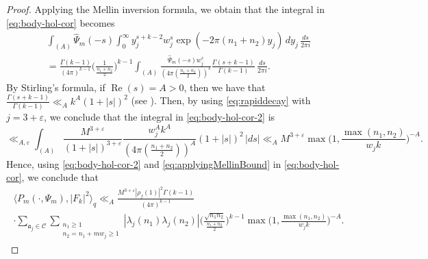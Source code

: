 \documentclass[12pt,reqno]{amsart}
\theoremstyle{remark}
\DeclareMathOperator{\Real}{Re}
\numberwithin{equation}{section}
\begin{document}
\begin{proof}
    Applying the Mellin inversion formula, we obtain that the integral in \eqref{eq:body-hol-cor} becomes 
		\begin{multline}\label{eq:body-hol-cor-2}
				\int_{(A)}\widehat{\Psi}_m(-s)\int_0^\infty y_j^{s+k-2}w_j^s\exp(-2\pi(n_1+n_2)y_j)\,dy_j\,\frac{ds}{2\pi i} \\
				 =  \frac{\Gamma(k-1)}{(4\pi)^{k-1}} \Big(\frac{1}{\frac{n_1+n_2}{2}}\Big)^{k-1}\int_{(A)}\frac{\widehat{\Psi}_m(-s)w_j^s}{(4\pi(\frac{n_1+n_2}{2}))^{s}}\frac{\Gamma(s+k-1)}{\Gamma(k-1)}\,\frac{ds}{2\pi i}.
		\end{multline} 
        By Stirling's formula, if $\Real(s)=A > 0$, then we have that $\frac{\Gamma(s+k-1)}{\Gamma(k-1)} \ll_A k^{A}(1+|s|)^2$ (see \cite[Eq.~(2.3)]{LS}). Then, by using \eqref{eq:rapiddecay} with $j = 3+\varepsilon$, we conclude that the integral in \eqref{eq:body-hol-cor-2} is
		\begin{equation}\label{eq:applyingMellinBound}
			\ll_{A, \varepsilon} \int_{(A)}\frac{M^{3+\varepsilon}}{(1+|s|)^{3+\varepsilon}}\frac{w_j^Ak^A}{(4\pi(\frac{n_1+n_2}{2}))^{A}}(1+|s|)^2\,|ds| \ll_A M^{3+\varepsilon} \max\Big(1, \frac{\max(n_1,n_2)}{w_jk}\Big)^{-A}.
		\end{equation}
        Hence, using \eqref{eq:body-hol-cor-2} and \eqref{eq:applyingMellinBound} in \eqref{eq:body-hol-cor},
        we conclude that
        \begin{multline}\label{eq:body-hol-cor-3} 
        \langle P_m(\cdot, \Psi_m), |F_k|^2 \rangle_q \ll_{A} \frac{M^{3+\varepsilon}|\rho_f(1)|^2\Gamma(k-1)}{(4\pi)^{k-1}} \\  \cdot \sum_{\mathfrak{a}_j \in \mathcal{C}}  \sum_{\substack{n_1\ge 1\\ n_2 =n_1+mw_j \ge 1}}|\lambda_j(n_1)\lambda_j(n_2)
        |\Big(\frac{\sqrt{n_1n_2}}{\frac{n_1+n_2}{2}}\Big)^{k-1} \max\Big(1, \frac{\max(n_1,n_2)}{w_jk}\Big)^{-A}.
		\end{multline}
	

\end{proof}
\end{document}
